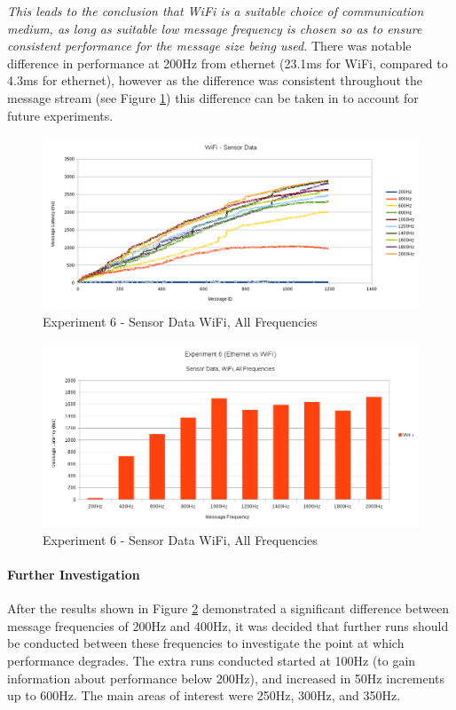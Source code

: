 \documentclass[../dissertation.tex]{subfiles}
\begin{document}
\textit{This leads to the conclusion that WiFi is a suitable choice of communication medium, as long as suitable low message frequency is chosen so as to ensure consistent performance for the message size being used.} There was notable difference in performance at 200Hz from ethernet (23.1ms for WiFi, compared to 4.3ms for ethernet), however as the difference was consistent throughout the message stream (see Figure \ref{exp6-sensor-wifi-all-freq-stream}) this difference can be taken in to account for future experiments.

\begin{figure}[H]
\centering
\includegraphics[width=\textwidth]{images/experiment6/sensor_data_wifi_all_freqs_stream.png}
\caption{Experiment 6 - Sensor Data WiFi, All Frequencies}
\label{exp6-sensor-wifi-all-freq-stream}
\end{figure}

\begin{figure}[H]
\centering
\includegraphics[width=\textwidth]{images/experiment6/sensor_data_wifi_all_freqs_mean.png}
\caption{Experiment 6 - Sensor Data WiFi, All Frequencies}
\label{exp6-sensor-wifi-all-freq-mean}
\end{figure}

\paragraph{Further Investigation} After the results shown in Figure \ref{exp6-sensor-wifi-all-freq-mean} demonstrated a significant difference between message frequencies of 200Hz and 400Hz, it was decided that further runs should be conducted between these frequencies to investigate the point at which performance degrades. The extra runs conducted started at 100Hz (to gain information about performance below 200Hz), and increased in 50Hz increments up to 600Hz. The main areas of interest were 250Hz, 300Hz, and 350Hz.
\end{document}
